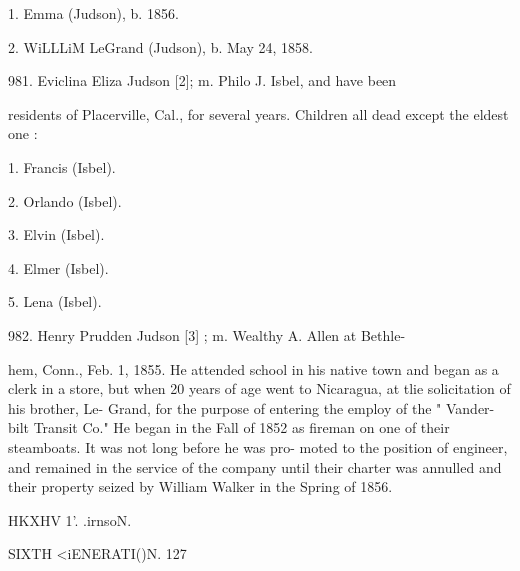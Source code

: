1. Emma (Judson), b. 1856. 

2. WiLLLiM LeGrand (Judson), b. May 24, 1858. 

981. Eviclina Eliza Judson [2]; m. Philo J. Isbel, and have been 

residents of Placerville, Cal., for several years. Children all 
dead except the eldest one : 

1. Francis (Isbel). 

2. Orlando (Isbel). 

3. Elvin (Isbel). 

4. Elmer (Isbel). 

5. Lena (Isbel). 

982. Henry Prudden Judson [3] ; m. Wealthy A. Allen at Bethle- 

hem, Conn., Feb. 1, 1855. He attended school in his native 
town and began as a clerk in a store, but when 20 years of 
age went to Nicaragua, at tlie solicitation of his brother, Le- 
Grand, for the purpose of entering the employ of the " Vander- 
bilt Transit Co." He began in the Fall of 1852 as fireman on 
one of their steamboats. It was not long before he was pro- 
moted to the position of engineer, and remained in the service 
of the company until their charter was annulled and their 
property seized by William Walker in the Spring of 1856. 




HKXHV 1'. .irnsoN. 



SIXTH <iENERATI()N. 127 

